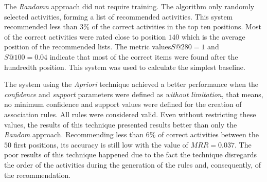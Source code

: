 \documentclass[10pt,letterpaper]{article}
\begin{document}
%

%
%
%

The \emph{Randomn} approach did not require training. The algorithm only randomly selected activities, forming a list of recommended activities. This system recommended less than \(3\%\) of the correct activities in the top ten positions. Most of the correct activities were rated close to position \(140\) which is the average position of the recommended lists. The metric values ​​\(S@280 = 1\) and \(S@100 = 0.04\) indicate that most of the correct items were found after the hundredth position. This system was used to calculate the simplest baseline.

The system using the \emph{Apriori} technique achieved a better performance when the \emph{confidence} and \emph{support} parameters were defined as \emph{without limitation}, that means, no minimum confidence and support values were defined for the creation of association rules. All rules were considered valid. Even without restricting these values, the results of this technique presented results better than only the \emph{Random} approach. Recommending less than \(6\%\) of correct activities between the \(50\) first positions, its accuracy is still low with the value of \(MRR = 0.037\). The poor results of this technique happened due to the fact the technique disregards the order of the activities during the generation of the rules and, consequently, of the recommendation.
\end{document}

